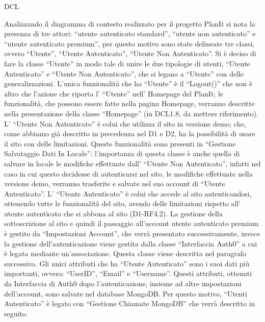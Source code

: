 \begin{listaPersonale}{DCL}

    Analizzando il diagramma di contesto realizzato per il progetto PlanIt si nota la presenza di tre attori: “utente autenticato standard”, “utente non autenticato” e “utente autenticato premium”, per questo motivo sono state delineate tre classi, ovvero “Utente”, “Utente Autenticato”, “Utente Non Autenticato”.
    Si è deciso di fare la classe “Utente” in modo tale di unire le due tipologie di utenti, “Utente Autenticato” e “Utente Non Autenticato”, che si legano a “Utente” con delle generalizzazioni. L'unica funzionalità che ha “Utente” è il “Logout()” che non è altro che l'azione che riporta l' “Utente” nell' Homepage del PlanIt; le funzionalità, che possono essere fatte nella pagina Homepage, verranno descritte nella presentazione della classe “Homepage” (in DCL1.8, da mettere riferimento).
    L' “Utente Non Autenticato” è colui che utilizza il sito in versione demo; che, come abbiamo già descritto in precedenza nel D1 e D2, ha la possibilità di usare il sito con delle limitazioni. Queste funzionalità sono presenti in “Gestione Salvataggio Dati In Locale”: l'importanza di questa classe è anche quella di salvare in locale le modifiche effettuate dall' “Utente Non Autenticato”, infatti nel caso in cui questo decidesse di autenticarsi nel sito, le modifiche effettuate nella versione demo, verranno trasferite e salvate nel suo account di “Utente Autenticato”.
    L' “Utente Autenticato” è colui che accede al sito autenticandosi, ottenendo tutte le funzionalità del sito, avendo delle limitazioni rispetto all' utente autenticato che si abbona al sito (D1-RF4.2). La gestione della sottoscrizione al sito e quindi il passaggio all'account utente autenticato premium è gestito da “Impostazioni Account”, che verrà presentato successivamente, invece la gestione dell'autenticazione viene gestita dalla classe “Interfaccia Auth0” a cui è legata mediante un'associazione. Questa classe viene descritta nel paragrafo successivo. Gli unici attributi che ha “Utente Autenticato” sono i suoi dati più importanti, ovvero: “UserID”, “Email” e “Username”. Questi attributi, ottenuti da Interfaccia di Auth0 dopo l'autenticazione, insieme ad altre impostazioni dell'account, sono salvate nel database MongoDB. Per questo motivo, “Utenti Autenticato” è legato con “Gestione Chiamate MongoDB” che verrà descritto in seguito.






\end{listaPersonale}
